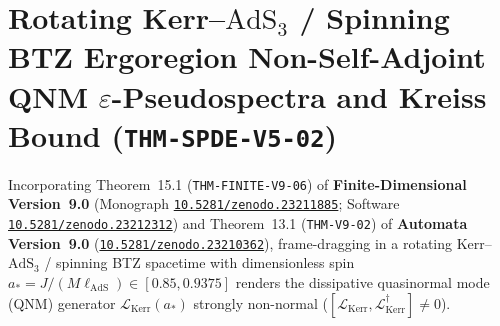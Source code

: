 \documentclass[11pt,a4paper,reqno]{article}
\newcommand{\zenodo}[1]{\href{https://doi.org/10.5281/zenodo.#1}{\nolinkurl{10.5281/zenodo.#1}}}
\theoremstyle{plain}
\theoremstyle{definition}
\theoremstyle{remark}
\numberwithin{equation}{section}
\begin{document}
\section{Rotating Kerr--\texorpdfstring{$\mathrm{AdS}_3$}{AdS3} / Spinning BTZ Ergoregion Non-Self-Adjoint QNM \texorpdfstring{$\varepsilon$}{Epsilon}-Pseudospectra and Kreiss Bound (\texttt{THM-SPDE-V5-02})}
\label{sec:spde_v5_kerr_ads3_pseudospectra}

Incorporating Theorem~15.1 (\texttt{THM-FINITE-V9-06}) of \textbf{Finite-Dimensional Version~9.0} (Monograph \zenodo{23211885}; Software \zenodo{23212312}) \cite{ananda2026finite_v90} and Theorem~13.1 (\texttt{THM-V9-02}) of \textbf{Automata Version~9.0} (\zenodo{23210362}), frame-dragging in a rotating Kerr--$\mathrm{AdS}_3$ / spinning BTZ spacetime with dimensionless spin $a_* = J/(M\ell_{\mathrm{AdS}}) \in [0.85, 0.9375]$ renders the dissipative quasinormal mode (QNM) generator $\mathcal{L}_{\mathrm{Kerr}}(a_*)$ strongly non-normal ($[\mathcal{L}_{\mathrm{Kerr}}, \mathcal{L}_{\mathrm{Kerr}}^\dagger] \neq 0$).
\end{document}
